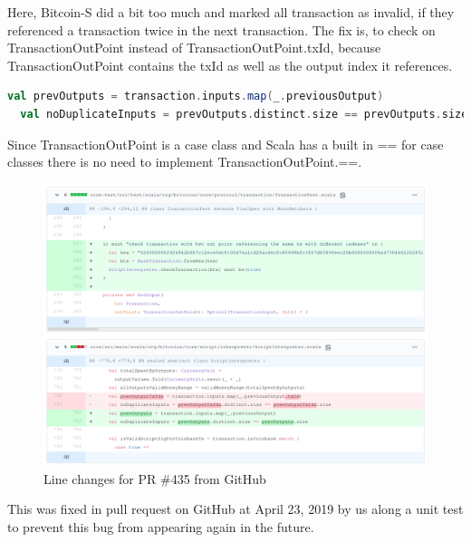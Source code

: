 Here, Bitcoin-S did a bit too much and marked all transaction as invalid, if they referenced a transaction twice in the next transaction.
The fix is, to check on TransactionOutPoint instead of TransactionOutPoint.txId, because TransactionOutPoint contains the txId as well as the output index it references.
\begin{lstlisting}[language=scala]
  val prevOutputs = transaction.inputs.map(_.previousOutput)
  val noDuplicateInputs = prevOutputs.distinct.size == prevOutputs.size
\end{lstlisting}
Since TransactionOutPoint is a case class and Scala has a built in == for case classes there is no need to implement TransactionOutPoint.==.
\begin{figure}[H]
	\centering
		\includegraphics[scale=0.396]{images/bitcoin-s-pr.png}
	\caption{Line changes for PR \#435 from GitHub}
	\label{fig:output1}
\end{figure}

This was fixed in pull request  on GitHub at April 23, 2019 by us along a unit test to prevent this bug from appearing again in the future.
